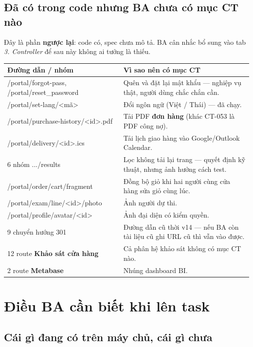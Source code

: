 \documentclass[11pt,a4paper]{report}
\newcommand{\rt}[1]{{\ttfamily\footnotesize #1}}
\begin{document}
\section{Đã có trong code nhưng BA chưa có mục CT nào}

Đây là phần \textbf{ngược lại}: code có, spec chưa mô tả. BA cân nhắc bổ sung vào tab
\textit{3. Controller} để sau này không ai tưởng là thiếu.

\begin{center}
\small
\begin{tabular}{@{}L{5.8cm}L{9.2cm}@{}}
\toprule
\textbf{Đường dẫn / nhóm} & \textbf{Vì sao nên có mục CT} \\
\midrule
\rt{/portal/forgot-pass}, \rt{/portal/reset\_password} & Quên và đặt lại mật khẩu — nghiệp vụ thật, người dùng chắc chắn cần. \\
\rt{/portal/set-lang/<mã>} & Đổi ngôn ngữ (Việt / Thái) — đã chạy. \\
\rt{/portal/purchase-history/<id>.pdf} & Tải PDF \textbf{đơn hàng} (khác CT-053 là PDF công nợ). \\
\rt{/portal/delivery/<id>.ics} & Tải lịch giao hàng vào Google/Outlook Calendar. \\
6 nhóm \rt{.../results} & Lọc không tải lại trang — quyết định kỹ thuật, nhưng ảnh hưởng cách test. \\
\rt{/portal/order/cart/fragment} & Đồng bộ giỏ khi hai người cùng cửa hàng sửa giỏ cùng lúc. \\
\rt{/portal/exam/line/<id>/photo} & Ảnh người dự thi. \\
\rt{/portal/profile/avatar/<id>} & Ảnh đại diện có kiểm quyền. \\
9 chuyển hướng 301 & Đường dẫn cũ thời v14 — nếu BA còn tài liệu cũ ghi URL cũ thì vẫn vào được. \\
12 route \textbf{Khảo sát cửa hàng} & Cả phân hệ khảo sát không có mục CT nào. \\
2 route \textbf{Metabase} & Nhúng dashboard BI. \\
\bottomrule
\end{tabular}
\end{center}

\chapter{Điều BA cần biết khi lên task}

\section{Cái gì đang có trên máy chủ, cái gì chưa}
\end{document}
